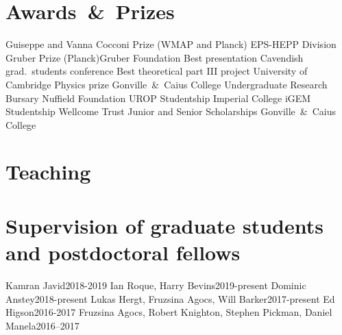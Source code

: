 \documentclass[11pt,a4paper,sans]{moderncv}
\begin{document}
\section{Awards~\&~Prizes}
  {Guiseppe and Vanna Cocconi Prize (WMAP and Planck)}         {EPS-HEPP Division}
  {Gruber Prize (Planck)}{Gruber Foundation}
  {Best presentation}                 {Cavendish grad.\ students conference}
  {Best theoretical part III project} {University of Cambridge} 
\cvitemwithcomment{}            {Physics prize}                     {Gonville~\&~Caius College} 
 {Undergraduate Research Bursary}    {Nuffield Foundation}  
\cvitemwithcomment{}            {UROP Studentship}                  {Imperial College} 
 {iGEM Studentship}                  {Wellcome Trust} 
    {Junior and Senior Scholarships}    {Gonville~\&~Caius College} 


\section{Teaching}

\section{Supervision of graduate students and postdoctoral fellows}
  {Kamran Javid}{2018-2019}
  {Ian Roque, Harry Bevins}{2019-present}
\cvitemwithcomment{}  {Dominic Anstey}{2018-present}
\cvitemwithcomment{}  {Lukas Hergt, Fruzsina Agocs, Will Barker}{2017-present}
\cvitemwithcomment{}  {Ed Higson}{2016-2017}
\cvitemwithcomment{}  {Fruzsina Agocs, Robert Knighton, Stephen Pickman, Daniel Manela}{2016--2017}
\end{document}
